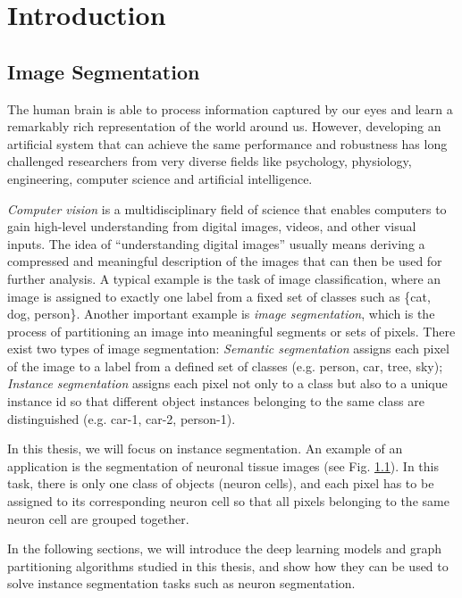 
\chapter{Introduction}

\section{Image Segmentation}
The human brain is able to process information captured by our eyes and learn a remarkably rich representation of the world around us. However, developing an artificial system that can achieve the same performance and robustness has long challenged researchers from very diverse fields like psychology, physiology, engineering, computer science and artificial intelligence.

\emph{Computer vision} is a multidisciplinary field of science that enables computers to gain high-level understanding from digital images, videos, and other visual inputs. 
The idea of ``understanding digital images'' usually means deriving a compressed and meaningful description of the images that can then be used for further analysis.
A typical example is the task of image classification, where an image is assigned to exactly one label from a fixed set of classes such as \{cat, dog, person\}. 
Another important example is \emph{image segmentation}, which is the process of partitioning an image into meaningful segments or sets of pixels. There exist two types of image segmentation: \emph{Semantic segmentation} assigns each pixel of the image to a label from a defined set of classes (e.g. person, car, tree, sky); \emph{Instance segmentation} assigns each pixel not only to a class but also to a unique instance id so that different object instances belonging to the same class are distinguished (e.g. car-1, car-2, person-1). 
 
In this thesis, we will focus on instance segmentation. An example of an application is the segmentation of neuronal tissue images (see Fig. \ref{}). In this task, there is only one class of objects (neuron cells), and each pixel has to be assigned to its corresponding neuron cell so that all pixels belonging to the same neuron cell are grouped together. 

In the following sections, we will introduce the deep learning models and graph partitioning algorithms studied in this thesis, and show how they can be used to solve instance segmentation tasks such as neuron segmentation.



